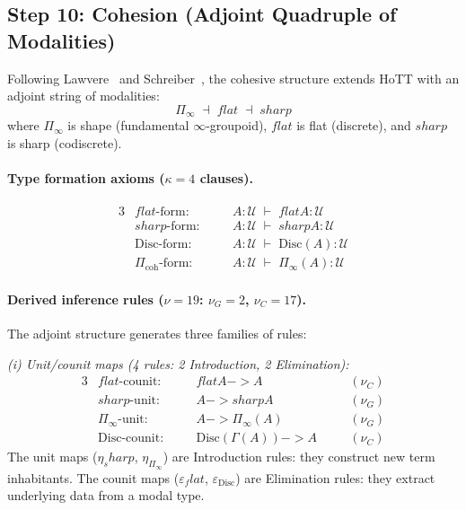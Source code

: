 \documentclass[11pt,a4paper]{article}
\def\to{->}%
\def\flat{flat}%
\def\sharp{sharp}%
\theoremstyle{plain}
\theoremstyle{definition}
\theoremstyle{remark}
\newcommand{\U}{\mathcal{U}}
\begin{document}
\subsection{Step 10: Cohesion (Adjoint Quadruple of Modalities)}
\label{app:cohesion-spec}

Following Lawvere~\cite{lawvere} and Schreiber~\cite{schreiber}, the cohesive structure extends HoTT with an adjoint string of modalities:
\[
    \Pi_{\!\infty} \;\dashv\; \flat \;\dashv\; \sharp
\]
where $\Pi_{\!\infty}$ is shape (fundamental $\infty$-groupoid), $\flat$ is flat (discrete), and $\sharp$ is sharp (codiscrete).

\paragraph{Type formation axioms ($\kappa = 4$ clauses).}
\begin{alignat*}{3}
    &\flat\text{-form:}   &\quad& A : \U \;\vdash\; \flat A : \U \\
    &\sharp\text{-form:}  && A : \U \;\vdash\; \sharp A : \U \\
    &\mathrm{Disc}\text{-form:} && A : \U \;\vdash\; \mathrm{Disc}(A) : \U \\
    &\Pi_{\mathrm{coh}}\text{-form:} && A : \U \;\vdash\; \Pi_{\!\infty}(A) : \U
\end{alignat*}

\paragraph{Derived inference rules ($\nu = 19$: $\nu_G = 2$, $\nu_C = 17$).}
The adjoint structure generates three families of rules:

\emph{(i) Unit/counit maps (4 rules: 2 Introduction, 2 Elimination):}
\begin{alignat*}{3}
    &\flat\text{-counit:}  &\quad& \flat A \to A  && \quad (\nu_C) \\
    &\sharp\text{-unit:}   && A \to \sharp A  && \quad (\nu_G) \\
    &\Pi_{\!\infty}\text{-unit:}   && A \to \Pi_{\!\infty}(A)  && \quad (\nu_G) \\
    &\mathrm{Disc}\text{-counit:}   && \mathrm{Disc}(\Gamma(A)) \to A  && \quad (\nu_C)
\end{alignat*}
The unit maps ($\eta_\sharp$, $\eta_{\Pi_\infty}$) are Introduction rules: they construct new term inhabitants.
The counit maps ($\varepsilon_\flat$, $\varepsilon_{\mathrm{Disc}}$) are Elimination rules: they extract underlying data from a modal type.
\end{document}
